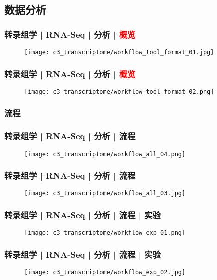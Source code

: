 \subsection{数据分析}
\begin{frame}
  \frametitle{转录组学 | RNA-Seq | 分析 | \textcolor{red}{概览}}
  \begin{figure}
    \centering
    \texttt{[image: c3\_transcriptome/workflow\_tool\_format\_01.jpg]}
  \end{figure}
\end{frame}

\begin{frame}
  \frametitle{转录组学 | RNA-Seq | 分析 | \textcolor{red}{概览}}
  \begin{figure}
    \centering
    \texttt{[image: c3\_transcriptome/workflow\_tool\_format\_02.png]}
  \end{figure}
\end{frame}

\subsubsection{流程}
\begin{frame}
  \frametitle{转录组学 | RNA-Seq | 分析 | 流程}
  \begin{figure}
    \centering
    \texttt{[image: c3\_transcriptome/workflow\_all\_04.png]}
  \end{figure}
\end{frame}

\begin{frame}
  \frametitle{转录组学 | RNA-Seq | 分析 | 流程}
  \begin{figure}
    \centering
    \texttt{[image: c3\_transcriptome/workflow\_all\_03.jpg]}
  \end{figure}
\end{frame}

\begin{frame}
  \frametitle{转录组学 | RNA-Seq | 分析 | 流程 | 实验}
  \begin{figure}
    \centering
    \texttt{[image: c3\_transcriptome/workflow\_exp\_01.png]}
  \end{figure}
\end{frame}

\begin{frame}
  \frametitle{转录组学 | RNA-Seq | 分析 | 流程 | 实验}
  \begin{figure}
    \centering
    \texttt{[image: c3\_transcriptome/workflow\_exp\_02.jpg]}
  \end{figure}
\end{frame}

